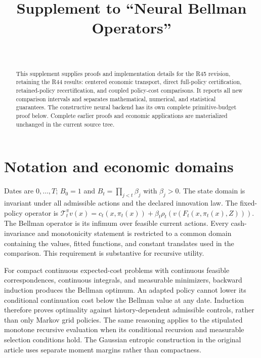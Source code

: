 \documentclass[ecta,nameyear,draft]{econsocart}
\begin{document}
\begin{frontmatter}
\title{Supplement to ``Neural Bellman Operators''}
\begin{aug}
\author[id=au1,addressref={add1}]{~}
\address[id=add1]{Peking University}
\end{aug}
\begin{abstract}
This supplement supplies proofs and implementation details for the R45 revision, retaining the R44 results: centered economic transport, direct full-policy certification, retained-policy recertification, and coupled policy-cost comparisons. It reports all new comparison intervals and separates mathematical, numerical, and statistical guarantees. The constructive neural backend has its own complete primitive-budget proof below. Complete earlier proofs and economic applications are materialized unchanged in the current source tree.
\end{abstract}
\end{frontmatter}
\section{Notation and economic domains}
Dates are $0,\ldots,T$; $B_0=1$ and $B_t=\prod_{j<t}\beta_j$ with $\beta_j>0$. The state domain is invariant under all admissible actions and the declared innovation law. The fixed-policy operator is
$\mathcal T_t^\pi v(x)=c_t(x,\pi_t(x))+\beta_t\rho_t(v(F_t(x,\pi_t(x),Z)))$.
The Bellman operator is its infimum over feasible current actions. Every cash-invariance and monotonicity statement is restricted to a common domain containing the values, fitted functions, and constant translates used in the comparison. This requirement is substantive for recursive utility.

For compact continuous expected-cost problems with continuous feasible correspondences, continuous integrals, and measurable minimizers, backward induction produces the Bellman optimum. An adapted policy cannot lower its conditional continuation cost below the Bellman value at any date. Induction therefore proves optimality against history-dependent admissible controls, rather than only Markov grid policies. The same reasoning applies to the stipulated monotone recursive evaluation when its conditional recursion and measurable selection conditions hold. The Gaussian entropic construction in the original article uses separate moment margins rather than compactness.
\end{document}
